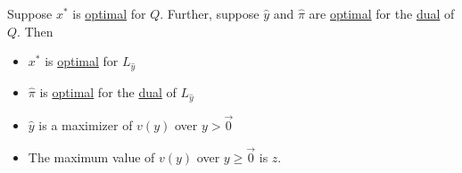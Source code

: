 \begin{theorem}\label{thm:Lagrangian-dual}
	Suppose \(x^{\ast}\) is \hyperref[def:optimal-solution]{optimal} for \(Q\). Further, suppose \(\hat{y}\) and \(\hat{\pi}\) are \hyperref[def:optimal-solution]{optimal}
	for the \hyperref[def:dual]{dual} of \(Q\). Then
	\begin{itemize}
		\item \(x^{\ast}\) is \hyperref[def:optimal-solution]{optimal} for \(L_{\hat{y}}\)
		\item \(\hat{\pi}\) is \hyperref[def:optimal-solution]{optimal} for the \hyperref[def:dual]{dual} of \(L_{\hat{y}}\)
		\item \(\hat{y}\) is a maximizer of \(v(y)\) over \(y>\vec{0}\)
		\item The maximum value of \(v(y)\) over \(y\geq \vec{0}\) is \(z\).
	\end{itemize}
\end{theorem}
